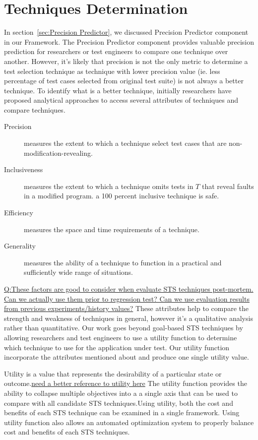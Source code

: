 \section{Techniques Determination}
\label{sec:Techniques Determination}
In section~\ref{sec:Precision Predictor}, we discussed Precision
Predictor component in our Framework. The Precision Predictor component provides
valuable precision prediction for researchers or test engineers to compare one
technique over another.  However, it's likely that precision is not the only metric to
determine a test selection technique as technique with lower precision value
(ie. less percentage of test cases selected from original test suite) is not
always a better technique. To identify what is a better technique, initially
researchers have proposed analytical approaches to access several attributes
of techniques and compare techniques\cite{DBLP:journals/tse/RothermelH96}.
\begin{description}
\item[Precision] measures the extent to which a technique select
test cases that are non-modification-revealing.
\item[Inclusiveness] measures the extent to which a technique
omits tests in $T$ that reveal faults in a modified program. a 100 percent
inclusive technique is safe.
\item[Efficiency] measures the space and time requirements of a
technique.
\item[Generality] measures the ability of a technique to function in a practical
and sufficiently wide range of situations.
\end{description} 

\underline{Q:These factors are good to consider when evaluate STS techniques
post-mortem. Can we actually use them prior to regression test? Can we use
evaluation results from previous experiments/history values?}%
These attributes help to compare the strength and weakness of techniques in
general, however it's a qualitative analysis rather than quantitative. Our work
goes beyond goal-based STS techniques by allowing researchers and test
engineers to use a utility function to determine which technique to use for the
application under test. Our utility function incorporate the attributes
mentioned about and produce one single utility value.

Utility is a value that represents the desirability of a particular state or
outcome.\underline{need a better reference to utility here}
The utility function provides the ability to collapse
multiple objectives into a a single axis that can be used to compare with all
candidate STS techniques.Using utility, both the cost and benefits of each STS
technique can be examined in a single framework. Using utility function also
allows an automated optimization system to properly balance cost and benefits of each STS
techniques.

